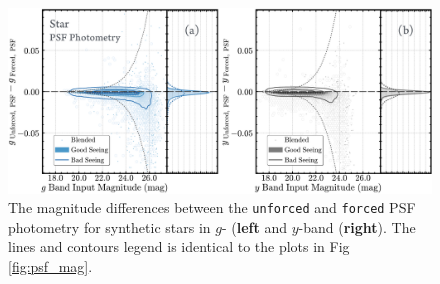 \documentclass[useamsfonts]{pasj01}
\def\forced{\texttt{forced}}
\def\unforced{\texttt{unforced}}
\begin{document}
\begin{figure}
    \begin{center}
        \includegraphics[width=\textwidth]{fig/synpipe_psf_diff}
    \end{center}
    \caption{
        The magnitude differences between the \unforced{} and \forced{}
        PSF photometry for synthetic stars in $g$- (\textbf{left} and $y$-band
        (\textbf{right}).
        The lines and contours legend is identical to the plots in Fig \ref{fig:psf_mag}.
        }
    \label{fig:psf_diff}
\end{figure}
\end{document}
